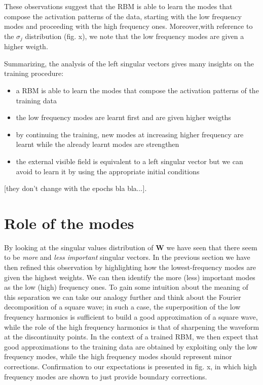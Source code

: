 \documentclass[twocolumn]{article}
\begin{document}
These observations suggest that the RBM is able to learn the modes that compose the activation patterns of the data, starting with the low frequency modes and proceeding with the high frequency ones. Moreover,with reference to the \(\sigma_j\) distribution (fig. x), we note that the low frequency modes are given a higher weigth.

Summarizing, the analysis of the left singular vectors gives many insights on the training procedure:

\begin{itemize}
\item a RBM is able to learn the modes that compose the activation patterns of the training data
\item the low frequency modes are learnt first and are given higher weigths
\item by continuing the training, new modes at increasing higher frequency are learnt while the already learnt modes are strengthen
\item the external visible field is equivalent to a left singular vector but we can avoid to learn it by using the appropriate initial conditions
\end{itemize}

[they don't change with the epochs bla bla...].

\section{Role of the modes}
By looking at the singular values distribution of \textbf{W} we have seen that there seem to be \textit{more} and \textit{less important} singular vectors. In the previous section we have then refined this observation by highlighting how the lowest-frequency modes are given the highest weights. We can then identify the more (less) important modes as the low (high) frequency ones. To gain some intuition about the meaning of this separation we can take our analogy further and think about the Fourier decomposition of a square wave; in such a case, the superposition of the low frequency harmonics is sufficient to build a good approximation of a square wave, while the role of the high frequency harmonics is that of sharpening the waveform at the discontinuity points. In the context of a trained RBM, we then expect that good approximations to the training data are obtained by exploiting only the low frequency modes, while the high frequency modes should represent minor corrections. Confirmation to our expectations is presented in fig. x, in which high frequency modes are shown to just provide boundary corrections.
\end{document}
